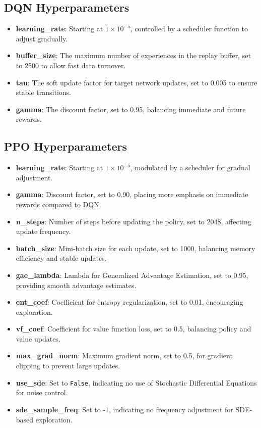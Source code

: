 \documentclass[
12pt, %
oneside, %
english, %
onehalfspacing, %
nolistspacing, %
liststotoc, %
headsepline, %
]{ProposalAndThesis} %
\begin{document}
\subsection{DQN Hyperparameters}
\begin{itemize}
    \item \textbf{learning\_rate}: Starting at \(1 \times 10^{-5}\), controlled by a scheduler function to adjust gradually.
    \item \textbf{buffer\_size}: The maximum number of experiences in the replay buffer, set to 2500 to allow fast data turnover.
    \item \textbf{tau}: The soft update factor for target network updates, set to 0.005 to ensure stable transitions.
    \item \textbf{gamma}: The discount factor, set to 0.95, balancing immediate and future rewards.
\end{itemize}

\subsection{PPO Hyperparameters}
\begin{itemize}
    \item \textbf{learning\_rate}: Starting at \(1 \times 10^{-5}\), modulated by a scheduler for gradual adjustment.
    \item \textbf{gamma}: Discount factor, set to 0.90, placing more emphasis on immediate rewards compared to DQN.
    \item \textbf{n\_steps}: Number of steps before updating the policy, set to 2048, affecting update frequency.
    \item \textbf{batch\_size}: Mini-batch size for each update, set to 1000, balancing memory efficiency and stable updates.
    \item \textbf{gae\_lambda}: Lambda for Generalized Advantage Estimation, set to 0.95, providing smooth advantage estimates.
    \item \textbf{ent\_coef}: Coefficient for entropy regularization, set to 0.01, encouraging exploration.
    \item \textbf{vf\_coef}: Coefficient for value function loss, set to 0.5, balancing policy and value updates.
    \item \textbf{max\_grad\_norm}: Maximum gradient norm, set to 0.5, for gradient clipping to prevent large updates.
    \item \textbf{use\_sde}: Set to \texttt{False}, indicating no use of Stochastic Differential Equations for noise control.
    \item \textbf{sde\_sample\_freq}: Set to -1, indicating no frequency adjustment for SDE-based exploration.
\end{itemize}


\printbibliography[heading=bibintoc]
\end{document}
